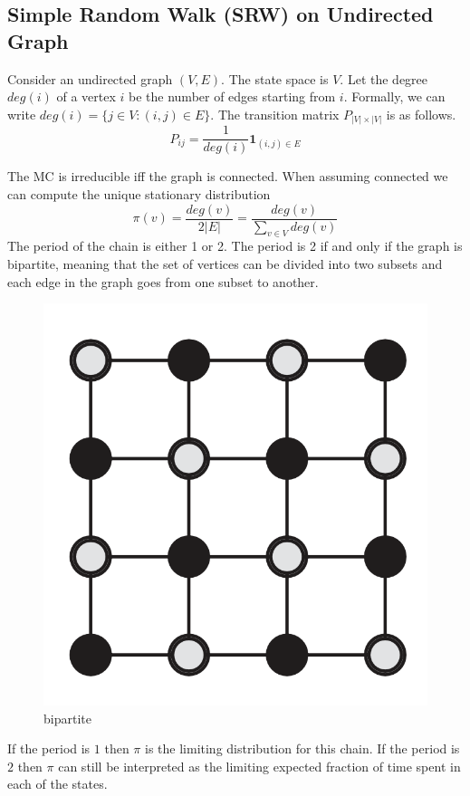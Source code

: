 \documentclass[11pt]{elegantbook}
\begin{document}
\subsection{Simple Random Walk (SRW) on Undirected Graph}
Consider an undirected graph $(V,E)$. The state space is $V$. Let the degree $deg(i)$ of a vertex $i$ be the number of edges starting from $i$. Formally, we can write $deg(i) = \{j \in V : (i, j) \in E\}$. The transition matrix $P_{|V|\times|V|}$ is as follows. $$P_{ij}=\frac{1}{deg(i)}\mathbf{1}_{(i,j)\in E}$$

The MC is irreducible iff the graph is connected. When assuming connected we can compute the unique stationary distribution $$\pi(v)=\frac{deg(v)}{2|E|}=\frac{deg(v)}{\sum_{v\in V}deg(v)}$$
The period of the chain is either 1 or 2. The period is 2 if and only if the graph is bipartite, meaning that the set of vertices can be divided into two subsets and each edge in the graph goes from one subset to another.
\begin{center}\begin{figure}[htbp]
    \centering
    \includegraphics[scale=0.15]{bipartite.png}
    \caption{bipartite}
    \label{}
\end{figure}\end{center}
If the period is $1$ then $\pi$ is the limiting distribution for this chain. If the period is $2$ then $\pi$ can still be interpreted as the limiting expected fraction of time spent in each of the states.
\end{document}
